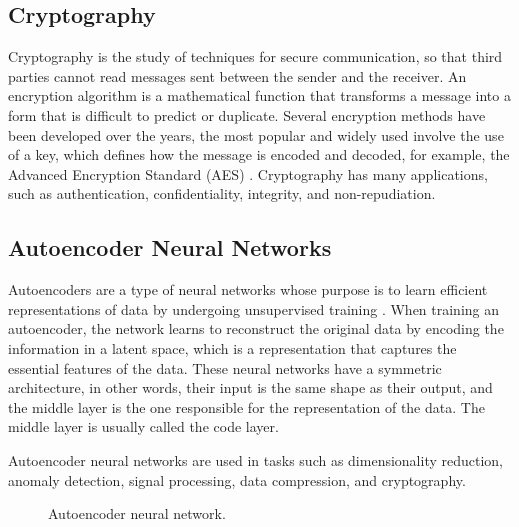 


\subsection{Cryptography}

Cryptography is the study of techniques for secure communication, so that third parties cannot read messages sent between the sender and the receiver. An encryption algorithm is a mathematical function that transforms a message into a form that is difficult to predict or duplicate. Several encryption methods have been developed over the years, the most popular and widely used involve the use of a key, which defines how the message is encoded and decoded, for example, the Advanced Encryption Standard (AES) \cite{aes}. Cryptography has many applications, such as authentication, confidentiality, integrity, and non-repudiation.

\subsection{Autoencoder Neural Networks}

Autoencoders are a type of neural networks whose purpose is to learn efficient representations of data by undergoing unsupervised training \cite{autoencoder}. When training an autoencoder, the network learns to reconstruct the original data by encoding the information in a latent space, which is a representation that captures the essential features of the data. These neural networks have a symmetric architecture, in other words, their input is the same shape as their output, and the middle layer is the one responsible for the representation of the data. The middle layer is usually called the code layer.

Autoencoder neural networks are used in tasks such as dimensionality reduction, anomaly detection, signal processing, data compression, and cryptography.

\begin{figure}[h]
    \centering
    
    \caption{Autoencoder neural network.}
    \label{fig:autoencoder}
\end{figure}

